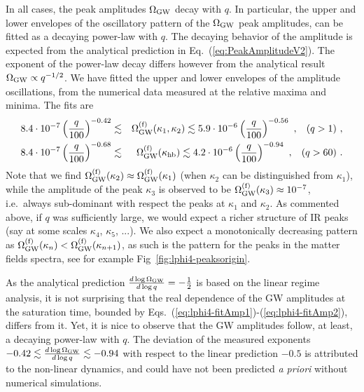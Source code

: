 \documentclass[a4paper,11pt]{article}
\newcommand{\bea}{\begin{eqnarray}}
\newcommand{\eea}{\end{eqnarray}}
\begin{document}
In all cases, the peak amplitudes $\Omega_{\rm GW}$ decay with $q$. In particular, the upper and lower envelopes of the oscillatory pattern of the $\Omega_{\rm GW}$ peak amplitudes, can be fitted as a decaying power-law with $q$. The decaying behavior of the amplitude is expected from the analytical prediction in Eq.~(\ref{eq:PeakAmplitudeV2}). The exponent of the power-law decay differs however from the analytical result $\Omega_{\rm GW} \propto q^{-1/2}$. We have fitted the upper and lower envelopes of the amplitude oscillations, from the numerical data measured at the relative maxima and minima. The fits are
 \bea
  8.4 \cdot 10^{-7} \left(\frac{q}{100} \right)^{-0.42} &\lesssim & \Omega_{\rm GW}^{\rm (f)} (\kappa_{1},\kappa_{2}) \lesssim 5.9 \cdot 10^{-6} \left(\frac{q}{100} \right)^{-0.56}  \ , \hspace{0.3cm} (q > 1) \ , \label{eq:lphi4-fitAmp1}\\  
 8.4 \cdot 10^{-7} \left(\frac{q}{100} \right)^{-0.68} & \lesssim & \Omega_{\rm GW}^{\rm (f)} (\kappa_{\rm hb}) \lesssim 4.2 \cdot 10^{-6} \left(\frac{q}{100} \right)^{-0.94}  \ , \hspace{0.3cm} (q > 60) \label{eq:lphi4-fitAmp2} \ .\eea
Note that we find $\Omega_{\rm GW}^{\rm (f) } (\kappa_2) \approx  \Omega_{\rm GW}^{\rm (f) } (\kappa_1 )$ (when $\kappa_2$ can be distinguished from $\kappa_1$), while the amplitude of the peak $\kappa_3$ is observed to be $\Omega_{\rm GW}^{\rm (f) } (\kappa_3 ) \approx 10^{-7}$, i.e.~always sub-dominant with respect the peaks at $\kappa_1$ and $\kappa_2$. As commented above,  if $q$ was sufficiently large, we would expect a richer structure of IR peaks (say at some scales $\kappa_4$, $\kappa_5$, ...). We also expect a monotonically decreasing pattern as $\Omega_{\rm GW}^{\rm (f) } (\kappa_{n} ) < \Omega_{\rm GW}^{\rm (f) } (\kappa_{n+1})$, as such is the pattern for the peaks in the matter fields spectra, see for example Fig~\ref{fig:lphi4-peaksorigin}.

As the analytical prediction ${d\log\Omega_{\rm GW}\over d\log q} = -{1\over2}$ is based on the linear regime analysis, it is not surprising that the real dependence of the GW amplitudes at the saturation time, bounded by Eqs.~(\ref{eq:lphi4-fitAmp1})-(\ref{eq:lphi4-fitAmp2}), differs from it. Yet, it is nice to observe that the GW amplitudes follow, at least, a decaying power-law with $q$. The deviation of the measured exponents $-0.42 \lesssim {d\log\Omega_{\rm GW}\over d\log q} \lesssim -0.94$ with respect to the linear prediction $-0.5$ is attributed to the non-linear dynamics, and could have not been predicted {\it a priori} without numerical simulations.
\end{document}
